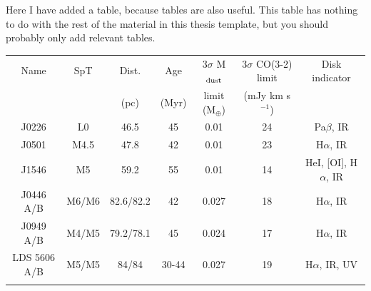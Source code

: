 Here I have added a table, because tables are also useful. This table has nothing to do with the rest of the material in this thesis template, but you should probably only add relevant tables.
\begin{table}[tbh]
\begin{center}
\begin{tabular}{ccccccc}
\hline \noalign {\smallskip}
Name & SpT & Dist. & Age & 3$\sigma$ M$_{\rm dust}$ & 3$\sigma$ CO(3-2) limit & Disk indicator \\
 & & (pc) & (Myr) & limit (M$_{\oplus}$) &  (mJy km s$^{-1}$)\\
\hline \noalign {\smallskip}
J0226 & L0 & 46.5 & 45 & 0.01 & 24 & Pa$\beta$, IR\\
J0501 & M4.5 & 47.8 & 42 & 0.01 & 23 & H$\alpha$, IR\\
J1546 & M5 & 59.2 & 55 & 0.01 & 14 & HeI, [OI], H$\alpha$, IR\\
J0446 A/B & M6/M6 & 82.6/82.2 & 42 &  0.027 & 18 & H$\alpha$, IR\\
J0949 A/B & M4/M5 & 79.2/78.1 & 45 &  0.024 & 17 & H$\alpha$, IR\\
LDS 5606 A/B & M5/M5 & 84/84 & 30-44 & 0.027 & 19 & H$\alpha$, IR, UV\\
\hline \noalign {\smallskip}
\end{tabular}
\end{center}
\end{table}


